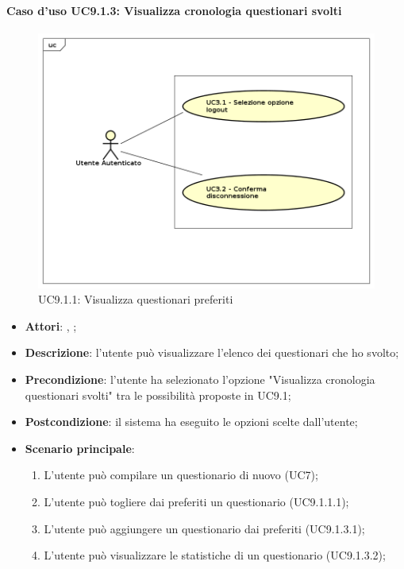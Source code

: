 		\paragraph{Caso d'uso UC9.1.3: Visualizza cronologia questionari svolti}
		\label{UC9.1.3}
		\begin{figure}[h]
			\centering
			\includegraphics[scale=0.7,keepaspectratio]{UML/UC9.png}
			\caption{UC9.1.1: Visualizza questionari preferiti}
		\end{figure}
		\FloatBarrier
		\begin{itemize}
			\item \textbf{Attori}: \uau, \uaupro;
			\item \textbf{Descrizione}: l'utente può visualizzare l'elenco dei questionari che ho svolto;
			\item \textbf{Precondizione}: l'utente ha selezionato l'opzione "Visualizza cronologia questionari svolti" tra le possibilità proposte in UC9.1;
			\item \textbf{Postcondizione}: il sistema ha eseguito le opzioni scelte dall'utente;
			\item \textbf{Scenario principale}: 
			\begin{enumerate}
				\item L'utente può compilare un questionario di nuovo (UC7);
				\item L'utente può togliere dai preferiti un questionario (UC9.1.1.1);
				\item L'utente può aggiungere un questionario dai preferiti (UC9.1.3.1);
				\item L'utente può visualizzare le statistiche di un questionario (UC9.1.3.2);
			\end{enumerate}
		\end{itemize}
		
